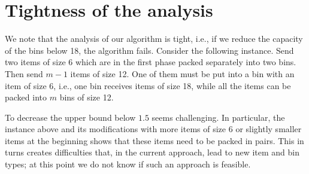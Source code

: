 \section{Tightness of the analysis}

We note that the analysis of our algorithm is tight, i.e., if we
reduce the capacity of the bins below 18, the algorithm
fails. Consider the following instance. Send two items of size 6
which are in the first phase packed separately into two bins. Then
send $m-1$ items of size 12. One of them must be put into a bin
with an item of size 6, i.e., one bin receives items of size 18, while
all the items can be packed into $m$ bins of size 12.

To decrease the upper bound below $1.5$ seems challenging. In
particular, the instance above and its modifications with more items
of size 6 or slightly smaller items at the beginning shows that these
items need to be packed in pairs. This in turns creates difficulties
that, in the current approach, lead to new item and bin types; at this
point we do not know if such an approach is feasible.


